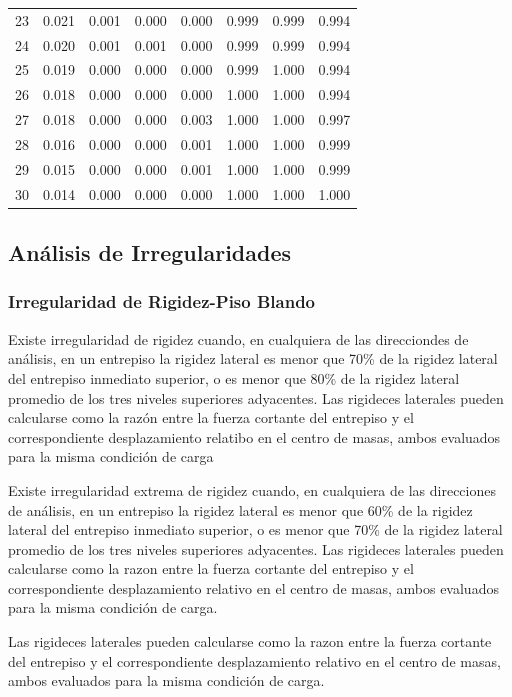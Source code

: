 \documentclass{article}%
\begin{document}
\begin{table}[H]
\begin{tabular}{cccccccc}
23 & 0.021 & 0.001 & 0.000 & 0.000 & 0.999 & 0.999 & 0.994 \\
24 & 0.020 & 0.001 & 0.001 & 0.000 & 0.999 & 0.999 & 0.994 \\
25 & 0.019 & 0.000 & 0.000 & 0.000 & 0.999 & 1.000 & 0.994 \\
26 & 0.018 & 0.000 & 0.000 & 0.000 & 1.000 & 1.000 & 0.994 \\
27 & 0.018 & 0.000 & 0.000 & 0.003 & 1.000 & 1.000 & 0.997 \\
28 & 0.016 & 0.000 & 0.000 & 0.001 & 1.000 & 1.000 & 0.999 \\
29 & 0.015 & 0.000 & 0.000 & 0.001 & 1.000 & 1.000 & 0.999 \\
30 & 0.014 & 0.000 & 0.000 & 0.000 & 1.000 & 1.000 & 1.000 \\
\bottomrule
\end{tabular}
%
\end{table}

%
\subsection{Análisis de Irregularidades}%
\label{subsec:AnlisisdeIrregularidades}%

%
\subsubsection{Irregularidad de Rigidez-Piso Blando}%
\label{ssubsec:IrregularidaddeRigidez{-}PisoBlando}%
\begin{tcolorbox}[colback=gray!5!white,colframe=cyan!75!black,fonttitle=\bfseries,title=Tabla N°9 E-030]%
Existe irregularidad de rigidez cuando, en cualquiera de las direcciondes de análisis, en un entrepiso la rigidez lateral es menor que 70\% de la rigidez lateral del entrepiso inmediato superior, o es menor que 80\% de la rigidez lateral promedio de los tres niveles superiores adyacentes. 
 Las rigideces laterales pueden calcularse como la razón entre la fuerza cortante del entrepiso y el correspondiente desplazamiento relatibo en el centro de masas, ambos evaluados para la misma condición de carga %
\end{tcolorbox}%
\begin{tcolorbox}[colback=gray!5!white,colframe=cyan!75!black,fonttitle=\bfseries,title=Tabla N°9 E-030]%

Existe irregularidad extrema de rigidez cuando, en cualquiera de las direcciones de análisis, en un entrepiso la rigidez lateral es menor que 60\% de la rigidez lateral del entrepiso inmediato superior, o es menor que 70\% de la rigidez lateral promedio de los tres niveles superiores adyacentes.
Las rigideces laterales pueden calcularse como la razon entre la fuerza cortante del entrepiso y el correspondiente desplazamiento relativo en el centro de masas, ambos evaluados para la misma condición de carga.%
\end{tcolorbox}%
Las rigideces laterales pueden calcularse como la razon entre la fuerza cortante del entrepiso y el correspondiente desplazamiento relativo en el centro de masas, ambos evaluados para la misma condición de carga. \newline%
%
\end{document}
